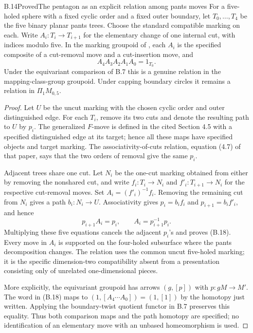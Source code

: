 \begin{result}{B.14}{Proved}{The pentagon as an explicit relation among pants moves}
For a five-holed sphere with a fixed cyclic order and a fixed
outer boundary, let $T_0,\ldots,T_4$ be the five binary planar
pants trees.  Choose the standard compatible marking on each.
Write $A_i:T_i\to T_{i+1}$ for the elementary change of one
internal cut, with indices modulo five.  In the marking groupoid
of \citet[Sections 4.5, 4.7 and 4.10]{B_BakalovKirillov}, each
$A_i$ is the specified composite of a cut-removal move and a
cut-insertion move, and
\[
 A_4A_3A_2A_1A_0=1_{T_0}. \tag{B.18}
\]
Under the equivariant comparison of B.7 this is a genuine
relation in the mapping-class-group groupoid.  Under capping
boundary circles it remains a relation in $\Pi_1M_{0,5}$.
\end{result}
\begin{proof}
Let $U$ be the uncut marking with the chosen cyclic order and
outer distinguished edge.  For each $T_i$, remove its two cuts
and denote the resulting path to $U$ by $p_i$.  The generalized
$F$-move is defined in the cited Section 4.5 with a specified
distinguished edge at its target; hence all these maps have
specified objects and target marking.  The associativity-of-cuts
relation, equation (4.7) of that paper, says that the two orders
of removal give the same $p_i$.

Adjacent trees share one cut.  Let $N_i$ be the one-cut marking
obtained from either by removing the nonshared cut, and write
$f_i:T_i\to N_i$ and $f'_i:T_{i+1}\to N_i$ for the respective
cut-removal moves.  Set $A_i=(f'_i)^{-1}f_i$.  Removing the remaining
cut from $N_i$ gives a path $b_i:N_i\to U$.  Associativity gives
$p_i=b_if_i$ and $p_{i+1}=b_if'_i$, and hence
\[
 p_{i+1}A_i=p_i,
 \qquad A_i=p_{i+1}^{-1}p_i.
\]
Multiplying these five equations cancels the adjacent $p_i$'s
and proves (B.18).  Every move in $A_i$ is supported on the
four-holed subsurface where the pants decomposition changes.
The relation uses the common uncut five-holed marking; it is the
specific dimension-two compatibility absent from a presentation
consisting only of unrelated one-dimensional pieces.

More explicitly, the equivariant groupoid has arrows $(g,[p])$
with $p:gM\to M'$.  The word in (B.18) maps to
$(1,[A_4\cdots A_0])=(1,[1])$ by the homotopy just written.
Applying the boundary-twist quotient functor in B.7 preserves
this equality.  Thus both comparison maps and the path homotopy
are specified; no identification of an elementary move with an
unbased homeomorphism is used.
\end{proof}

